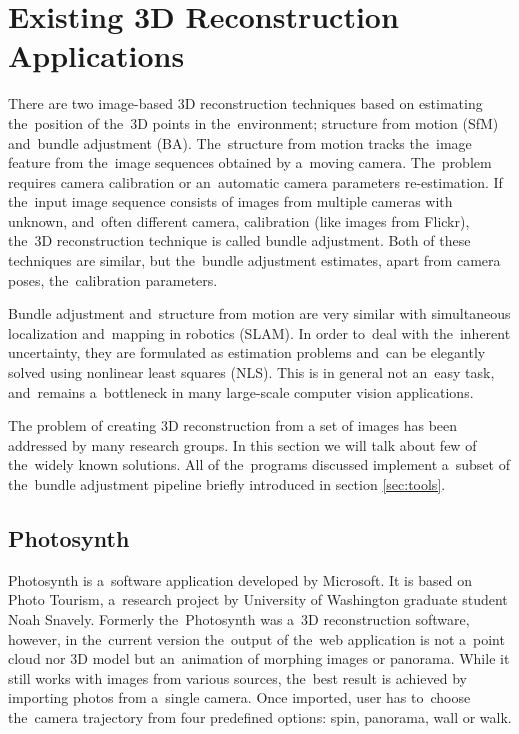 \section{Existing 3D Reconstruction Applications}
\label{sec:existing_3D_reconstruction_solutions}
There are two image-based 3D reconstruction techniques based on estimating the~position of the~3D points in the~environment; structure from motion (SfM) and~bundle adjustment (BA). The~structure from motion tracks the~image feature from the~image sequences obtained by a~moving camera. The~problem requires camera calibration or an~automatic camera parameters re-estimation. If the~input image sequence consists of images from multiple cameras with unknown, and~often different camera, calibration (like images from Flickr), the~3D reconstruction technique is called bundle adjustment. Both of these techniques are similar, but the~bundle adjustment estimates, apart from camera poses, the~calibration parameters.

Bundle adjustment and~structure from motion are very similar with simultaneous localization and~mapping in robotics (SLAM). In order to~deal with the~inherent uncertainty, they are formulated as estimation problems and~can be elegantly solved using nonlinear least squares (NLS). This is in general not an~easy task, and~remains a~bottleneck in many large-scale computer vision applications.

The problem of creating 3D reconstruction from a set of images has been addressed by many research groups. In this section we will talk about few of the~widely known solutions. All of the~programs discussed implement a~subset of the~bundle adjustment pipeline briefly introduced in section \ref{sec:tools}.

\subsection*{Photosynth}
Photosynth is a~software application developed by Microsoft. It is based on Photo Tourism, a~research project by University of Washington graduate student Noah Snavely. Formerly the~Photosynth was a~3D reconstruction software, however, in the~current version the~output of the~web application is not a~point cloud nor 3D model but an~animation of morphing images or panorama. While it still works with images from various sources, the~best result is achieved by importing photos from a~single camera. Once imported, user has to~choose the~camera trajectory from four predefined options: spin, panorama, wall or walk. 

